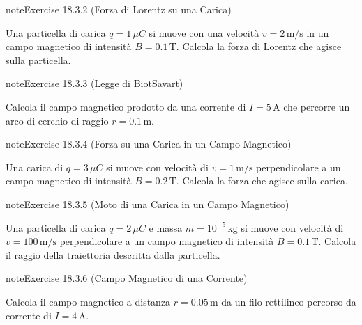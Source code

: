 \documentclass[letterpaper,10pt,italian]{jupyterBook}
\begin{document}
\begin{sphinxadmonition}{note}{Exercise 18.3.2 (Forza di Lorentz su una Carica)}



\sphinxAtStartPar
Una particella di carica \(q = 1 \, \mu C\) si muove con una velocità \(v = 2 \, \text{m/s}\) in un campo magnetico di intensità \(B = 0.1 \, \text{T}\). Calcola la forza di Lorentz che agisce sulla particella.
\end{sphinxadmonition}
 \label{exercise:ch/electromagnetism/electromagnetism-steady-problems-exercise-2}

\begin{sphinxadmonition}{note}{Exercise 18.3.3 (Legge di Biot\sphinxhyphen{}Savart)}



\sphinxAtStartPar
Calcola il campo magnetico prodotto da una corrente di \(I = 5 \, \text{A}\) che percorre un arco di cerchio di raggio \(r = 0.1 \, \text{m}\).
\end{sphinxadmonition}
 \label{exercise:ch/electromagnetism/electromagnetism-steady-problems-exercise-3}

\begin{sphinxadmonition}{note}{Exercise 18.3.4 (Forza su una Carica in un Campo Magnetico)}



\sphinxAtStartPar
Una carica di \(q = 3 \, \mu C\) si muove con velocità di \(v = 1 \, \text{m/s}\) perpendicolare a un campo magnetico di intensità \(B = 0.2 \, \text{T}\). Calcola la forza che agisce sulla carica.
\end{sphinxadmonition}
 \label{exercise:ch/electromagnetism/electromagnetism-steady-problems-exercise-4}

\begin{sphinxadmonition}{note}{Exercise 18.3.5 (Moto di una Carica in un Campo Magnetico)}



\sphinxAtStartPar
Una particella di carica \(q = 2 \, \mu C\) e massa \(m = 10^{-5} \, \text{kg}\) si muove con velocità di \(v = 100 \, \text{m/s}\) perpendicolare a un campo magnetico di intensità \(B = 0.1 \, \text{T}\). Calcola il raggio della traiettoria descritta dalla particella.
\end{sphinxadmonition}
 \label{exercise:ch/electromagnetism/electromagnetism-steady-problems-exercise-5}

\begin{sphinxadmonition}{note}{Exercise 18.3.6 (Campo Magnetico di una Corrente)}



\sphinxAtStartPar
Calcola il campo magnetico a distanza \(r = 0.05 \, \text{m}\) da un filo rettilineo percorso da corrente di \(I = 4 \, \text{A}\).
\end{sphinxadmonition}
 \label{exercise:ch/electromagnetism/electromagnetism-steady-problems-exercise-6}
\end{document}
